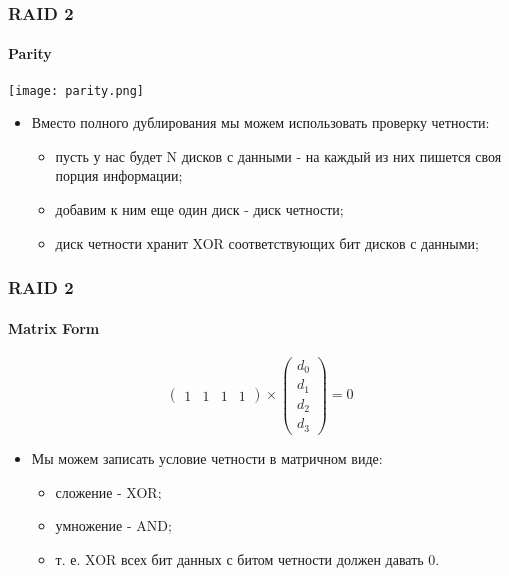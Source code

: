 \begin{frame}
\frametitle{RAID 2}
\framesubtitle{Parity}
\begin{center}
  \texttt{[image: parity.png]}
\end{center}
\begin{itemize}
  \item Вместо полного дублирования мы можем использовать проверку четности:
  \begin{itemize}
    \item пусть у нас будет N дисков с данными - на каждый из них пишется своя
    порция информации;
    \item добавим к ним еще один диск - диск четности;
    \item диск четности хранит XOR соответствующих бит дисков с данными;
  \end{itemize}
\end{itemize}
\end{frame}

\begin{frame}
\frametitle{RAID 2}
\framesubtitle{Matrix Form}
\[
  \left(
    \begin{array}{cccc}
      1 & 1 & 1 & 1
    \end{array}
  \right) \times \left(
    \begin{array}{c}
      d_0 \\
      d_1 \\
      d_2 \\
      d_3
    \end{array}
  \right) = 0
\]
\begin{itemize}
  \item Мы можем записать условие четности в матричном виде:
  \begin{itemize}
    \item сложение - XOR;
    \item умножение - AND;
    \item т. е. XOR всех бит данных с битом четности должен давать 0.
  \end{itemize}
\end{itemize}
\end{frame}


